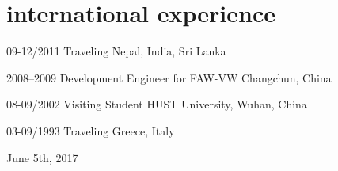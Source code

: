 \documentclass[]{friggeri-cv} %
\begin{document}

\section{international experience }

\begin{entrylist}

\entry
{09-12/2011}
{\normalfont Traveling}
{Nepal, India, Sri Lanka}
{\vspace{-4mm}}

\entry
{2008--2009}
{\normalfont Development Engineer for FAW-VW}
{Changchun, China}
{\vspace{-4mm}}

\entry
{08-09/2002}
{\normalfont Visiting Student}
{HUST University, Wuhan, China}
{\vspace{-4mm}}

\entry
{03-09/1993}
{\normalfont Traveling}
{Greece, Italy}
{\vspace{-4mm}}

\end{entrylist}



\hfill June 5th, 2017
\end{document}
